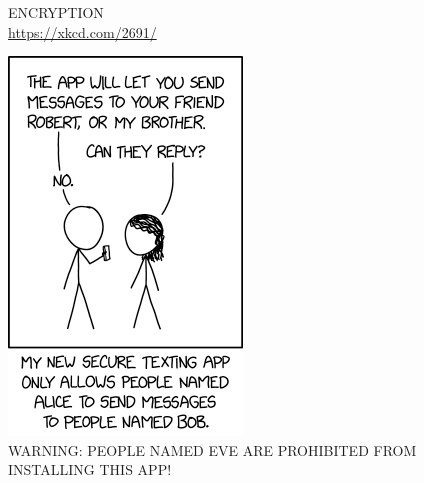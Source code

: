 \vfill

\begin{figure}[htb]
\centering
\caption*{\uppercase{Encryption} \\ \url{https://xkcd.com/2691/}}
\includegraphics[scale=0.75]{encryption}
\caption*{\uppercase{WARNING: PEOPLE NAMED EVE ARE PROHIBITED FROM INSTALLING THIS APP!}}
\end{figure}

